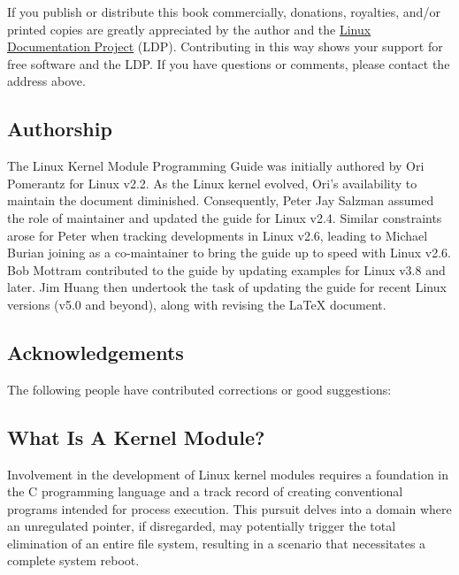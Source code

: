 \documentclass[10pt, oneside]{book}
\begin{document}
If you publish or distribute this book commercially, donations, royalties, and/or printed copies are greatly appreciated by the author and the \href{https://tldp.org/}{Linux Documentation Project} (LDP).
Contributing in this way shows your support for free software and the LDP. If you have questions or comments, please contact the address above.

\subsection{Authorship}
\label{sec:authorship}

The Linux Kernel Module Programming Guide was initially authored by Ori Pomerantz for Linux v2.2.
As the Linux kernel evolved, Ori's availability to maintain the document diminished.
Consequently, Peter Jay Salzman assumed the role of maintainer and updated the guide for Linux v2.4.
Similar constraints arose for Peter when tracking developments in Linux v2.6,
leading to Michael Burian joining as a co-maintainer to bring the guide up to speed with Linux v2.6.
Bob Mottram contributed to the guide by updating examples for Linux v3.8 and later.
Jim Huang then undertook the task of updating the guide for recent Linux versions (v5.0 and beyond),
along with revising the LaTeX document.

\subsection{Acknowledgements}
\label{sec:acknowledgements}

The following people have contributed corrections or good suggestions: 

\begin{flushleft}

\end{flushleft}

\subsection{What Is A Kernel Module?}
\label{sec:kernelmod}

Involvement in the development of Linux kernel modules requires a foundation in the C programming language and a track record of creating conventional programs intended for process execution.
This pursuit delves into a domain where an unregulated pointer, if disregarded,
may potentially trigger the total elimination of an entire file system,
resulting in a scenario that necessitates a complete system reboot.
\end{document}
